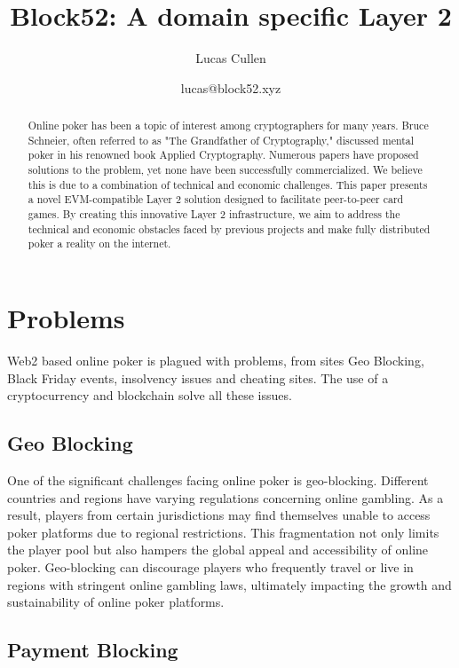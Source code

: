 \documentclass{article}
\title{Block52: A domain specific Layer 2}
\author{Lucas Cullen}
\author{lucas@block52.xyz}
\begin{document}
\maketitle

\begin{abstract}
Online poker has been a topic of interest among cryptographers for many years. Bruce Schneier, often referred to as "The Grandfather of Cryptography," discussed mental poker in his renowned book Applied Cryptography. Numerous papers have proposed solutions to the problem, yet none have been successfully commercialized. We believe this is due to a combination of technical and economic challenges. This paper presents a novel EVM-compatible Layer 2 solution designed to facilitate peer-to-peer card games. By creating this innovative Layer 2 infrastructure, we aim to address the technical and economic obstacles faced by previous projects and make fully distributed poker a reality on the internet.
\end{abstract}

\section{Problems}

Web2 based online poker is plagued with problems, from sites Geo Blocking, Black Friday events, insolvency issues and cheating sites.  The use of a cryptocurrency and blockchain solve all these issues.

\subsection{Geo Blocking}

One of the significant challenges facing online poker is geo-blocking. Different countries and regions have varying regulations concerning online gambling. As a result, players from certain jurisdictions may find themselves unable to access poker platforms due to regional restrictions. This fragmentation not only limits the player pool but also hampers the global appeal and accessibility of online poker. Geo-blocking can discourage players who frequently travel or live in regions with stringent online gambling laws, ultimately impacting the growth and sustainability of online poker platforms.

\subsection{Payment Blocking}
\end{document}
